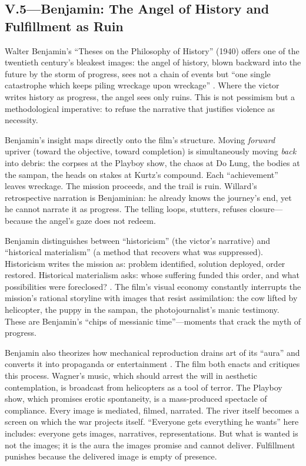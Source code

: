\subsection*{V.5—Benjamin: The Angel of History and Fulfillment as Ruin}
\label{ssec:v-benjamin}
Walter Benjamin's ``Theses on the Philosophy of History'' (1940) offers one of the twentieth 
century's bleakest images: the angel of history, blown backward into the future by the storm 
of progress, sees not a chain of events but ``one single catastrophe which keeps piling 
wreckage upon wreckage'' \parencite{BenjaminTheses1969}. Where the victor writes history as 
progress, the angel sees only ruins. This is not pessimism but a methodological imperative: to 
refuse the narrative that justifies violence as necessity.

Benjamin's insight maps directly onto the film's structure. Moving \emph{forward} upriver 
(toward the objective, toward completion) is simultaneously moving \emph{back} into debris: 
the corpses at the Playboy show, the chaos at Do Lung, the bodies at the sampan, the heads on 
stakes at Kurtz's compound. Each ``achievement'' leaves wreckage. The mission proceeds, and 
the trail is ruin. Willard's retrospective narration is Benjaminian: he already knows the 
journey's end, yet he cannot narrate it as progress. The telling loops, stutters, refuses 
closure---because the angel's gaze does not redeem.

Benjamin distinguishes between ``historicism'' (the victor's narrative) and ``historical 
materialism'' (a method that recovers what was suppressed). Historicism writes the mission as: 
problem identified, solution deployed, order restored. Historical materialism asks: whose 
suffering funded this order, and what possibilities were foreclosed? 
\parencite{BenjaminTheses1969}. The film's visual economy constantly interrupts the mission's 
rational storyline with images that resist assimilation: the cow lifted by helicopter, the 
puppy in the sampan, the photojournalist's manic testimony. These are Benjamin's ``chips of 
messianic time''---moments that crack the myth of progress.

Benjamin also theorizes how mechanical reproduction drains art of its ``aura'' and converts it 
into propaganda or entertainment \parencite{BenjaminArtwork1969}. The film both enacts and 
critiques this process. Wagner's music, which should arrest the will in aesthetic 
contemplation, is broadcast from helicopters as a tool of terror. The Playboy show, which 
promises erotic spontaneity, is a mass-produced spectacle of compliance. Every image is 
mediated, filmed, narrated. The river itself becomes a screen on which the war projects itself. 
``Everyone gets everything he wants'' here includes: everyone gets images, narratives, 
representations. But what is wanted is not the images; it is the aura the images promise and 
cannot deliver. Fulfillment punishes because the delivered image is empty of presence.

